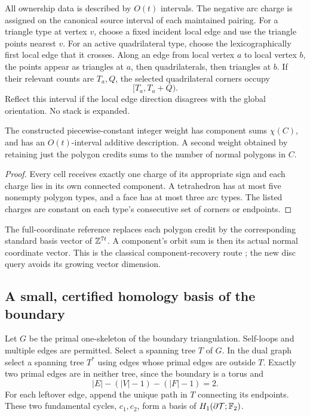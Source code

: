 All ownership data is described by $O(t)$ intervals. The negative arc charge
is assigned on the canonical source interval of each maintained pairing.
For a triangle type at vertex $v$, choose a fixed incident local edge and use
the triangle points nearest $v$. For an active quadrilateral type, choose the
lexicographically first local edge that it crosses. Along an edge from local
vertex $a$ to local vertex $b$, the points appear as triangles at $a$, then
quadrilaterals, then triangles at $b$. If their relevant counts are $T_a,Q$,
the selected quadrilateral corners occupy
\[
                            [T_a,T_a+Q).
\]
Reflect this interval if the local edge direction disagrees with the global
orientation. No stack is expanded.

\begin{lemma}\label{lem:cell-weight}
The constructed piecewise-constant integer weight has component sums
$\chi(C)$, and has an $O(t)$-interval additive description. A second weight
obtained by retaining just the polygon credits sums to the number of normal
polygons in $C$.
\end{lemma}
\begin{proof}
Every cell receives exactly one charge of its appropriate sign and each
charge lies in its own connected component. A tetrahedron has at most five
nonempty polygon types, and a face has at most three arc types. The listed
charges are constant on each type's consecutive set of corners or endpoints.
\end{proof}

The full-coordinate reference replaces each polygon credit by the corresponding
standard basis vector of $\mathbb Z^{7t}$. A component's orbit sum is then its actual
normal coordinate vector. This is the classical component-recovery route
\cite{AHT2006}; the new disc query avoids its growing vector dimension.

\subsection{A small, certified homology basis of the boundary}

Let $G$ be the primal one-skeleton of the boundary triangulation. Self-loops
and multiple edges are permitted. Select a spanning tree $T$ of $G$. In the
dual graph select a spanning tree $T^*$ using edges whose primal edges are
outside $T$. Exactly two primal edges are in neither tree, since the boundary
is a torus and
\[
 |E|-(|V|-1)-(|F|-1)=2.
\]
For each leftover edge, append the unique path in $T$ connecting its endpoints.
These two fundamental cycles, $c_1,c_2$, form a basis of
$H_1(\partial\mathcal T;\mathbb F_2)$.

